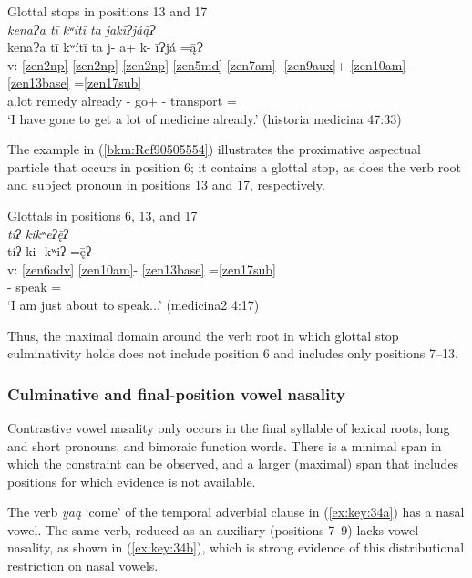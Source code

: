\documentclass[output=paper]{langscibook}
\begin{document}
\ea\label{bkm:Ref83399628}Glottal stops in positions 13 and 17\\
\textit{ kenaɁa tī kʷítī ta jakīɁjáą̄Ɂ}\\
\glll {} kenaɁa tī kʷítī ta j- a+ k- īɁjá =ą̄Ɂ\\
v: \ref{zen2np} \ref{zen2np} \ref{zen2np} \ref{zen5md} \ref{zen7am}{}- \ref{zen9aux}+ \ref{zen10am}{}- \ref{zen13base} =\ref{zen17sub}\\
{} a.lot \Tplz{} remedy already \Pfv{}- go+ \Pot{}- transport =\First\Sg{}\\
\glt `I have gone to get a lot of medicine already.' (historia medicina 47:33)
\z

The example in (\ref{bkm:Ref90505554}) illustrates the proximative aspectual particle that occurs in position 6; it contains a glottal stop, as does the verb root and subject pronoun in positions 13 and 17, respectively.


\ea\label{bkm:Ref90505554}Glottals in positions 6, 13, and 17\\
\textit{ tíʔ kikʷeʔ\={ę}ʔ}\\
\glll {} tíʔ ki- kʷiʔ =\={ę}ʔ\\
v: \ref{zen6adv} \ref{zen10am}{}- \ref{zen13base} =\ref{zen17sub}\\
{} \Prx{} \Pot{}- speak =\First\Sg{}\\
\glt `I am just about to speak...' (medicina2 4:17)
\z

Thus, the maximal domain around the verb root in which glottal stop culminativity holds does not include position 6 and includes only positions 7{}--13.

\subsubsection{Culminative and final-position vowel nasality}
\label{bkm:Ref113372594}\label{bkm:Ref84412913}
Contrastive vowel nasality only occurs in the final syllable of lexical roots, long and short pronouns, and bimoraic function words. There is a minimal span in which the constraint can be observed, and a larger (maximal) span that includes positions for which evidence is not available.

\label{bkm:Ref113308220}
The verb \textit{yaą} `come' of the temporal adverbial clause in (\ref{ex:key:34a}) has a nasal vowel. The same verb, reduced as an auxiliary (positions 7{}--9) lacks vowel nasality, as shown in (\ref{ex:key:34b}), which is strong evidence of this distributional restriction on nasal vowels. 
\end{document}
